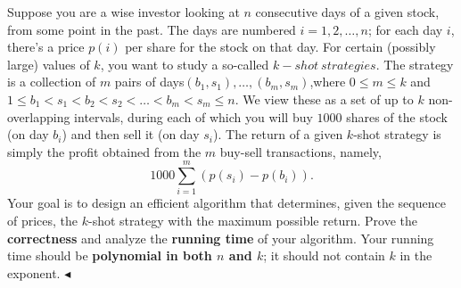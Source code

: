 \documentclass[11pt]{article}
\newenvironment{problem}[2][Problem]{\begin{trivlist}
\item[\hskip \labelsep{\bfseries#1}\hskip\labelsep{\bfseries#2.}]}{\hfill$\blacktriangleleft$\end{trivlist}}
\begin{document}
\begin{problem}{3 (Investing in the Stock)}
    Suppose you are a wise investor looking at $n$ consecutive days
     of a given stock, from some point in the past. The days are 
     numbered $i = 1, 2, \dots , n$; for each day $i$, there’s a 
     price $p(i)$ per share for the stock on that day. For certain
      (possibly large) values of $k$, you want to study a so-called
       $k-shot~ strategies$. The strategy is a collection 
       of $m$ pairs of days$(b_1,s_1),\dots,(b_m,s_m)$,where $0 \le m \le k$ and
       $1 \le b_1 <s_1 <b_2 <s_2 <\dots<b_m <s_m \le n$. We view these
        as a set of up to $k$ non-overlapping intervals, during each 
        of which you will buy $1000$ shares of the stock (on day $b_i$) 
        and then sell it (on day $s_i$). The return of a given $k$-shot 
        strategy is simply the profit obtained from the $m$ buy-sell transactions, namely,
        \[ 1000 \sum_{i=1}^{m} \left(p(s_i) - p(b_i)\right). \]
        Your goal is to design an efficient algorithm that determines, 
        given the sequence of prices, the $k$-shot strategy with 
        the maximum possible return. Prove the \textbf{correctness} and
         analyze the \textbf{running time} of your algorithm. 
         Your running time should be \textbf{polynomial in both $n$ and $k$}; 
         it should not contain $k$ in the exponent.
\end{problem}
\end{document}
